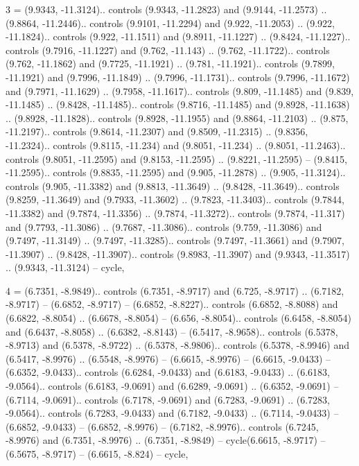 3 = {(9.9343, -11.3124).. controls (9.9343, -11.2823) and (9.9144, -11.2573) .. (9.8864, -11.2446).. controls (9.9101, -11.2294) and (9.922, -11.2053) .. (9.922, -11.1824).. controls (9.922, -11.1511) and (9.8911, -11.1227) .. (9.8424, -11.1227).. controls (9.7916, -11.1227) and (9.762, -11.143) .. (9.762, -11.1722).. controls (9.762, -11.1862) and (9.7725, -11.1921) .. (9.781, -11.1921).. controls (9.7899, -11.1921) and (9.7996, -11.1849) .. (9.7996, -11.1731).. controls (9.7996, -11.1672) and (9.7971, -11.1629) .. (9.7958, -11.1617).. controls (9.809, -11.1485) and (9.839, -11.1485) .. (9.8428, -11.1485).. controls (9.8716, -11.1485) and (9.8928, -11.1638) .. (9.8928, -11.1828).. controls (9.8928, -11.1955) and (9.8864, -11.2103) .. (9.875, -11.2197).. controls (9.8614, -11.2307) and (9.8509, -11.2315) .. (9.8356, -11.2324).. controls (9.8115, -11.234) and (9.8051, -11.234) .. (9.8051, -11.2463).. controls (9.8051, -11.2595) and (9.8153, -11.2595) .. (9.8221, -11.2595) -- (9.8415, -11.2595).. controls (9.8835, -11.2595) and (9.905, -11.2878) .. (9.905, -11.3124).. controls (9.905, -11.3382) and (9.8813, -11.3649) .. (9.8428, -11.3649).. controls (9.8259, -11.3649) and (9.7933, -11.3602) .. (9.7823, -11.3403).. controls (9.7844, -11.3382) and (9.7874, -11.3356) .. (9.7874, -11.3272).. controls (9.7874, -11.317) and (9.7793, -11.3086) .. (9.7687, -11.3086).. controls (9.759, -11.3086) and (9.7497, -11.3149) .. (9.7497, -11.3285).. controls (9.7497, -11.3661) and (9.7907, -11.3907) .. (9.8428, -11.3907).. controls (9.8983, -11.3907) and (9.9343, -11.3517) .. (9.9343, -11.3124) -- cycle},

4 = {(6.7351, -8.9849).. controls (6.7351, -8.9717) and (6.725, -8.9717) .. (6.7182, -8.9717) -- (6.6852, -8.9717) -- (6.6852, -8.8227).. controls (6.6852, -8.8088) and (6.6822, -8.8054) .. (6.6678, -8.8054) -- (6.656, -8.8054).. controls (6.6458, -8.8054) and (6.6437, -8.8058) .. (6.6382, -8.8143) -- (6.5417, -8.9658).. controls (6.5378, -8.9713) and (6.5378, -8.9722) .. (6.5378, -8.9806).. controls (6.5378, -8.9946) and (6.5417, -8.9976) .. (6.5548, -8.9976) -- (6.6615, -8.9976) -- (6.6615, -9.0433) -- (6.6352, -9.0433).. controls (6.6284, -9.0433) and (6.6183, -9.0433) .. (6.6183, -9.0564).. controls (6.6183, -9.0691) and (6.6289, -9.0691) .. (6.6352, -9.0691) -- (6.7114, -9.0691).. controls (6.7178, -9.0691) and (6.7283, -9.0691) .. (6.7283, -9.0564).. controls (6.7283, -9.0433) and (6.7182, -9.0433) .. (6.7114, -9.0433) -- (6.6852, -9.0433) -- (6.6852, -8.9976) -- (6.7182, -8.9976).. controls (6.7245, -8.9976) and (6.7351, -8.9976) .. (6.7351, -8.9849) -- cycle(6.6615, -8.9717) -- (6.5675, -8.9717) -- (6.6615, -8.824) -- cycle},

